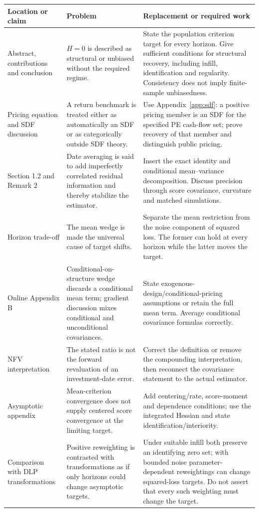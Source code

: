 \documentclass[11pt]{article}
\theoremstyle{plain}
\theoremstyle{definition}
\begin{document}
{\small
\begin{longtable}{@{}L{3.1cm}L{5.2cm}L{7.0cm}@{}}
\toprule
Location or claim & Problem & Replacement or required work\\
\midrule
\endhead
Abstract, contributions and conclusion & $H=0$ is described as structural or unbiased without the required regime. & State the population criterion target for every horizon. Give sufficient conditions for structural recovery, including infill, identification and regularity. Consistency does not imply finite-sample unbiasedness.\\
Pricing equation and SDF discussion & A return benchmark is treated either as automatically an SDF or as categorically outside SDF theory. & Use Appendix~\ref{app:sdf}: a positive pricing member is an SDF for the specified PE cash-flow set; prove recovery of that member and distinguish public pricing.\\
Section 1.2 and Remark 2 & Date averaging is said to add imperfectly correlated residual information and thereby stabilize the estimator. & Insert the exact identity and conditional mean--variance decomposition. Discuss precision through score covariance, curvature and matched simulations.\\
Horizon trade-off & The mean wedge is made the universal cause of target shifts. & Separate the mean restriction from the noise component of squared loss. The former can hold at every horizon while the latter moves the target.\\
Online Appendix B & Conditional-on-structure wedge discards a conditional mean term; gradient discussion mixes conditional and unconditional covariances. & State exogenous-design/conditional-pricing assumptions or retain the full mean term. Average conditional covariance formulas correctly.\\
NFV interpretation & The stated ratio is not the forward revaluation of an investment-date error. & Correct the definition or remove the compounding interpretation, then reconnect the covariance statement to the actual estimator.\\
Asymptotic appendix & Mean-criterion convergence does not supply centered score convergence at the limiting target. & Add centering/rate, score-moment and dependence conditions; use the integrated Hessian and state identification/interiority.\\
Comparison with DLP transformations & Positive reweighting is contrasted with transformations as if only horizons could change asymptotic targets. & Under suitable infill both preserve an identifying zero set; with bounded noise parameter-dependent reweightings can change squared-loss targets. Do not assert that every such weighting must change the target.\\

\end{longtable}}
\end{document}
